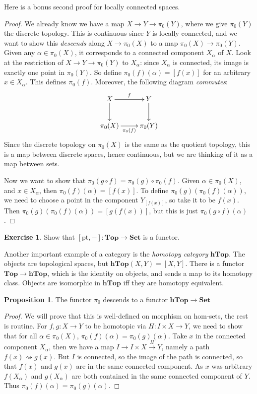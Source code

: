 \documentclass{tufte-handout}
\def\pt {\mathrm{pt}}
\def\Set {\mathbf{Set}}
\def\Top {\mathbf{Top}}
\def\Ho {\mathbf{hTop}}
\newcommand{\lecturenum}[1]{\marginnote{\color{red}Lecture #1}}
\theoremstyle{definition}
\newtheorem{prop}{Proposition}
\newtheorem{ex}{Exercise}
\begin{document}
Here is a bonus second proof for locally connected spaces.
\begin{proof} 
We already know we have a map $X\to Y \to \pi_0(Y)$, where we give $\pi_0(Y)$ the discrete
topology. This is continuous since $Y$ is 
locally connected, and we want to show this 
\emph{descends} along $X\to \pi_0(X)$ to a map $\pi_0(X) \to \pi_0(Y)$. 
Given any $\alpha \in \pi_0(X)$, it corresponds to a 
connected component $X_\alpha$ of $X$. Look at the restriction of $X\to Y\to\pi_0(Y)$ to 
$X_\alpha$: since $X_\alpha$ is connected, its image is exactly one point in $\pi_0(Y)$. 
So define $\pi_0(f)(\alpha)=[f(x)]$ for an arbitrary $x\in X_\alpha$.
This defines $\pi_0(f)$. Moreover, the following diagram \emph{commutes}:
\[
	\xymatrix{
		X\ar[r]^f \ar[d] & Y \ar[d]\\
		\pi_0(X) \ar[r]_{\pi_0(f)} & \pi_0(Y) 
	}
\]
Since the discrete topology on $\pi_0(X)$ is the same as the quotient topology, this is
a map between discrete spaces, hence continuous, but we are thinking of it as a map between 
sets.

Now we want to show that $\pi_0(g\circ f) = \pi_0(g)\circ \pi_0(f)$. Given $\alpha \in 
\pi_0(X)$, and $x\in X_\alpha$, then $\pi_0(f)(\alpha) = [f(x)]$. To define 
$\pi_0(g)\left(\pi_0(f)(\alpha)\right)$, we need to choose a point in the component 
$Y_{[f(x)]}$, so take it to be $f(x)$. Then $\pi_0(g)\left(\pi_0(f)(\alpha)\right) = 
[g(f(x))]$, but this is just $\pi_0(g\circ f)(\alpha)$.
\end{proof}

\begin{ex}
Show that $[\pt,-]\colon \Top \to \Set$ is a functor.\marginnote{Or more generally, 
$[X,-]\colon \Top\to \Set$!}
\end{ex}

Another important example of a category is the \emph{homotopy category} $\Ho$. 
 The objects are topological spaces, but 
$\Ho(X,Y) = [X,Y]$. There is a functor $\Top \to \Ho$, which is the identity on objects, 
and sends a map to its homotopy class. Objects are isomorphic in $\Ho$ iff they are 
homotopy equivalent.

\begin{prop}
The\lecturenum{4} functor $\pi_0$ descends to a functor $\Ho \to \Set$
\end{prop}

\begin{proof}
We will prove that this is well-defined on morphism on hom-sets, the rest is routine. 
For $f,g\colon X\to Y$ to be homotopic via $H\colon I\times X\to Y$, we need to show that for all $\alpha \in \pi_0(X)$, $\pi_0(f)(\alpha) = \pi_0(g)(\alpha)$. 
Take $x$ in the connected component $X_\alpha$, then we have a map $I \to I \times X \xrightarrow{H} Y$, namely a path 
$f(x) \rightsquigarrow g(x)$. 
But $I$ is connected, so the image of the path is connected, so that $f(x)$ and $g(x)$ are in the same connected component. As $x$ was arbitrary $f(X_\alpha)$ and $g(X_\alpha)$ are both contained in the same connected component
of $Y$. Thus $\pi_0(f)(\alpha)=\pi_0(g)(\alpha)$.
\end{proof}
\end{document}
